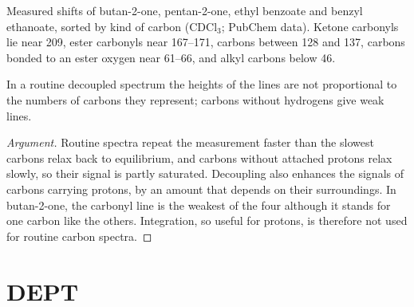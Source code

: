 \begin{omfigure}

{\small Measured  shifts of butan-2-one, pentan-2-one, ethyl benzoate and benzyl ethanoate,
sorted by kind of carbon (CDCl$_3$; PubChem data). Ketone carbonyls lie near 209, ester carbonyls near
167--171,  carbons between 128 and 137, carbons bonded to an ester oxygen near 61--66, and
alkyl carbons below 46.}
\end{omfigure}

\begin{proposition}\label{prop:b2:structure-determination:intensities}
In a routine decoupled  spectrum the heights of the lines are not proportional to the
numbers of carbons they represent; carbons without hydrogens give weak lines.
\end{proposition}

\begin{proof}[Argument]
Routine spectra repeat the measurement faster than the slowest carbons relax back to equilibrium, and
carbons without attached protons relax slowly, so their signal is partly saturated. Decoupling also
enhances the signals of carbons carrying protons, by an amount that depends on their surroundings.
In butan-2-one, the carbonyl line is the weakest of the four although it stands for one carbon like
the others. Integration, so useful for protons, is therefore not used for routine carbon spectra.
\end{proof}

\section{DEPT}

